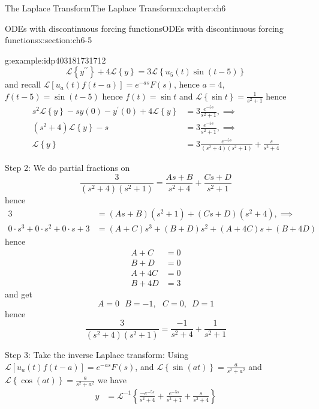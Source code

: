 \documentclass[oneside,10pt,]{book}
\numberwithin{equation}{section}
\numberwithin{equation}{section}
\newcommand{\amp}{&}
\begin{document}
\begin{chapterptx}{The Laplace Transform}{}{The Laplace Transform}{}{}{x:chapter:ch6}
\begin{sectionptx}{ODEs with discontinuous forcing functions}{}{ODEs with discontinuous forcing functions}{}{}{x:section:ch6-5}
\begin{example}{}{g:example:idp403181731712}
\begin{equation*}
\mathcal{L}\left\{ y^{\prime\prime}\right\} +4\mathcal{L}\left\{ y\right\} =3\mathcal{L}\left\{ u_{5}(t)\sin\left(t-5\right)\right\} 
\end{equation*}
and recall \(\mathcal{L}\left[u_{a}(t)f(t-a)\right]=e^{-as}F(s)\), hence \(a=4\), \(f(t-5)=\sin\left(t-5\right)\) hence \(f(t)=\sin t\) and \(\mathcal{L}\left\{ \sin t\right\} =\frac{1}{s^{2}+1}\) hence%
\begin{align*}
s^{2}\mathcal{L}\left\{ y\right\} -sy(0)-y^{\prime}(0)+4\mathcal{L}\left\{ y\right\}  \amp =3\frac{e^{-5s}}{s^{2}+1},\implies\\
\left(s^{2}+4\right)\mathcal{L}\left\{ y\right\} -s \amp =3\frac{e^{-5s}}{s^{2}+1},\implies\\
\mathcal{L}\left\{ y\right\}  \amp =3\frac{e^{-5s}}{\left(s^{2}+4\right)\left(s^{2}+1\right)}+\frac{s}{s^{2}+4}
\end{align*}
%
\par
Step 2: We do partial fractions on%
\begin{equation*}
\frac{3}{\left(s^{2}+4\right)\left(s^{2}+1\right)}=\frac{As+B}{s^{2}+4}+\frac{Cs+D}{s^{2}+1}
\end{equation*}
hence%
\begin{align*}
3 \amp =\left(As+B\right)\left(s^{2}+1\right)+\left(Cs+D\right)\left(s^{2}+4\right),\implies\\
0\cdot s^{3}+0\cdot s^{2}+0\cdot s+3 \amp =\left(A+C\right)s^{3}+\left(B+D\right)s^{2}+\left(A+4C\right)s+\left(B+4D\right)
\end{align*}
hence%
\begin{align*}
A+C \amp =0\\
B+D \amp =0\\
A+4C \amp =0\\
B+4D \amp =3
\end{align*}
and get%
\begin{equation*}
A=0\,\,\,\,B=-1,\,\,\,\,C=0,\,\,\,D=1
\end{equation*}
hence%
\begin{equation*}
\frac{3}{\left(s^{2}+4\right)\left(s^{2}+1\right)}=\frac{-1}{s^{2}+4}+\frac{1}{s^{2}+1}
\end{equation*}
%
\par
Step 3: Take the inverse Laplace transform: Using \(\mathcal{L}\left[u_{a}(t)f(t-a)\right]=e^{-as}F(s)\), and \(\mathcal{L}\left\{ \sin(at)\right\} =\frac{a}{s^{2}+a^{2}}\) and \(\mathcal{L}\left\{ \cos(at)\right\} =\frac{a}{s^{2}+a^{2}}\) we have%
\begin{align*}
y \amp =\mathcal{L}^{-1}\left\{ \frac{-e^{-5s}}{s^{2}+4}+\frac{e^{-5s}}{s^{2}+1}+\frac{s}{s^{2}+4}\right\} \\

\end{align*}
\end{example}
\end{sectionptx}
\end{chapterptx}
\end{document}
